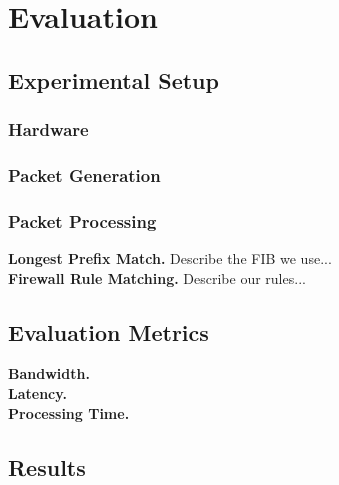 \section{Evaluation}

\subsection{Experimental Setup}

\subsubsection{Hardware}

\subsubsection{Packet Generation}

\subsubsection{Packet Processing}

\noindent \textbf{Longest Prefix Match.} Describe the FIB we use...\\

\noindent \textbf{Firewall Rule Matching.} Describe our rules...


\subsection{Evaluation Metrics}

\noindent \textbf{Bandwidth.} \\

\noindent \textbf{Latency.} \\

\noindent \textbf{Processing Time.}


\subsection{Results}
